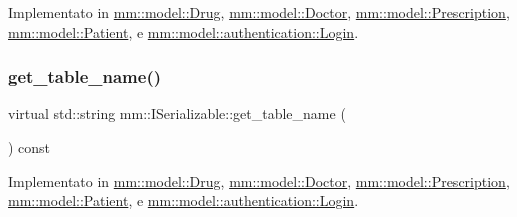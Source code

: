 Implementato in \mbox{\hyperlink{classmm_1_1model_1_1_drug_a019770ab95f95f34bbc204c4c3860bfa}{mm\+::model\+::\+Drug}}, \mbox{\hyperlink{classmm_1_1model_1_1_doctor_a935989cbe2274076c2b409126d4faccd}{mm\+::model\+::\+Doctor}}, \mbox{\hyperlink{classmm_1_1model_1_1_prescription_af521915f8872df18ae4a50ff2a4f59ff}{mm\+::model\+::\+Prescription}}, \mbox{\hyperlink{classmm_1_1model_1_1_patient_ae85640f3cb3d34bb57e1129ef46a0cbf}{mm\+::model\+::\+Patient}}, e \mbox{\hyperlink{structmm_1_1model_1_1authentication_1_1_login_a56f5da26be2d64baa78d0c81d99c8221}{mm\+::model\+::authentication\+::\+Login}}.

\mbox{\label{classmm_1_1_i_serializable_a9717e6da47fcbac3ffa2e68152464e0a}} 
\subsubsection{\texorpdfstring{get\+\_\+table\+\_\+name()}{get\_table\_name()}}
{\footnotesize\ttfamily virtual std\+::string mm\+::\+I\+Serializable\+::get\+\_\+table\+\_\+name (\begin{DoxyParamCaption}{ }\end{DoxyParamCaption}) const\hspace{0.3cm}{\ttfamily [pure virtual]}}



Implementato in \mbox{\hyperlink{classmm_1_1model_1_1_drug_a7fa9dbb569b89f397d4b865b778b3751}{mm\+::model\+::\+Drug}}, \mbox{\hyperlink{classmm_1_1model_1_1_doctor_af4c37e48f9e5ff26f2295678f10afaa3}{mm\+::model\+::\+Doctor}}, \mbox{\hyperlink{classmm_1_1model_1_1_prescription_a8de9a927dc92c0e0b15dac6f930889e3}{mm\+::model\+::\+Prescription}}, \mbox{\hyperlink{classmm_1_1model_1_1_patient_abe79da3e4fabd80e039ae4880dfa76cb}{mm\+::model\+::\+Patient}}, e \mbox{\hyperlink{structmm_1_1model_1_1authentication_1_1_login_afc72adef91be3d97ce4751b8a2357613}{mm\+::model\+::authentication\+::\+Login}}.

\mbox{\label{classmm_1_1_i_serializable_a20a59e2324c8dbf6fefe4d11ae89d0fb}} 
